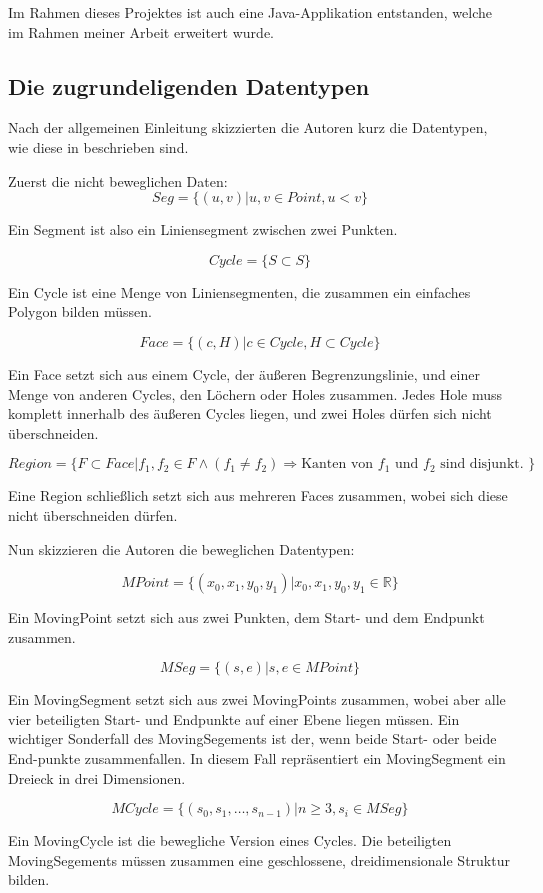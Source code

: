 Im Rahmen dieses Projektes ist auch eine Java-Applikation entstanden, welche im Rahmen meiner Arbeit erweitert wurde.

\subsection{Die zugrundeligenden Datentypen}\label{DatenMoving}
Nach der allgemeinen Einleitung skizzierten die Autoren kurz die Datentypen, wie diese in \cite{FGNS} beschrieben sind.

Zuerst die nicht beweglichen Daten:
$$Seg=\{(u,v)|u,v\in Point, u<v\}$$

Ein Segment ist also ein Liniensegment zwischen zwei Punkten. 

$$Cycle=\{S\subset S\}$$

Ein Cycle ist eine Menge von Liniensegmenten, die zusammen ein einfaches Polygon bilden müssen.

$$Face=\{(c,H)|c\in Cycle, H \subset Cycle\}$$

Ein Face setzt sich aus einem Cycle, der äußeren Begrenzungslinie, und einer Menge von anderen Cycles, den Löchern oder Holes zusammen. Jedes Hole muss komplett innerhalb des äußeren Cycles liegen, und zwei Holes dürfen sich nicht überschneiden. 

$$Region=\{F\subset Face|f_1,f_2\in F \wedge (f_1\neq f_2) \Rightarrow \text{Kanten von }f_1\text{ und } f_2 \text{ sind disjunkt. } \}$$

Eine Region schließlich setzt sich aus mehreren Faces zusammen, wobei sich diese nicht überschneiden dürfen. 

Nun skizzieren die Autoren die beweglichen Datentypen:

$$MPoint=\{(x_0,x_1,y_0,y_1)|x_0,x_1,y_0,y_1\in \mathbb{R}\}$$

Ein MovingPoint setzt sich aus zwei Punkten, dem Start- und dem Endpunkt zusammen.

$$MSeg=\{(s,e)|s,e\in MPoint\}$$

Ein MovingSegment setzt sich aus zwei MovingPoints zusammen, wobei aber alle vier beteiligten Start- und Endpunkte auf einer Ebene liegen müssen. Ein wichtiger Sonderfall des MovingSegements ist der, wenn beide Start- oder beide End-punkte zusammenfallen. In diesem Fall repräsentiert ein MovingSegment ein Dreieck in drei Dimensionen.

$$MCycle=\{(s_0,s_1,\hdots ,s_{n-1})|n\geq3, s_i\in MSeg\}$$

Ein MovingCycle ist die bewegliche Version eines Cycles. Die beteiligten MovingSegements müssen zusammen eine geschlossene, dreidimensionale Struktur bilden.

